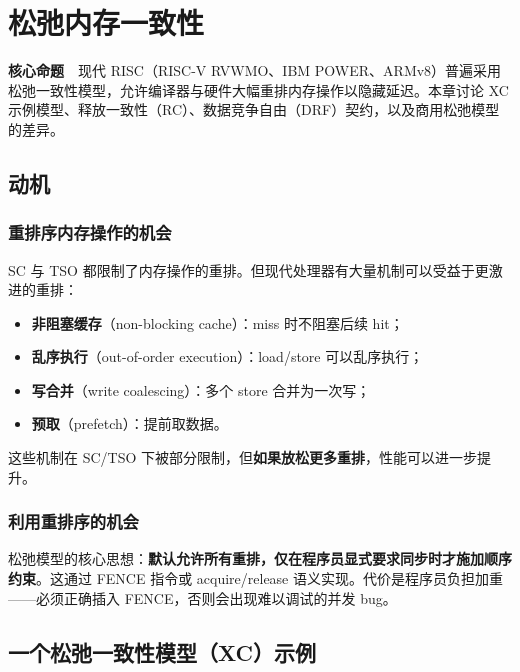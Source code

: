 \chapter{松弛内存一致性}

\begin{epigraph}
\textbf{核心命题}　现代 RISC（RISC-V RVWMO、IBM POWER、ARMv8）普遍采用松弛一致性模型，允许编译器与硬件大幅重排内存操作以隐藏延迟。本章讨论 XC 示例模型、释放一致性（RC）、数据竞争自由（DRF）契约，以及商用松弛模型的差异。
\end{epigraph}



\section{动机}

\subsection{重排序内存操作的机会}

SC 与 TSO 都限制了内存操作的重排。但现代处理器有大量机制可以受益于更激进的重排：

\begin{itemize}
\item \textbf{非阻塞缓存}（non-blocking cache）：miss 时不阻塞后续 hit；
\item \textbf{乱序执行}（out-of-order execution）：load/store 可以乱序执行；
\item \textbf{写合并}（write coalescing）：多个 store 合并为一次写；
\item \textbf{预取}（prefetch）：提前取数据。
\end{itemize}


这些机制在 SC/TSO 下被部分限制，但\textbf{如果放松更多重排}，性能可以进一步提升。

\subsection{利用重排序的机会}

松弛模型的核心思想：\textbf{默认允许所有重排，仅在程序员显式要求同步时才施加顺序约束}。这通过 FENCE 指令或 acquire/release 语义实现。代价是程序员负担加重——必须正确插入 FENCE，否则会出现难以调试的并发 bug。

\section{一个松弛一致性模型（XC）示例}

